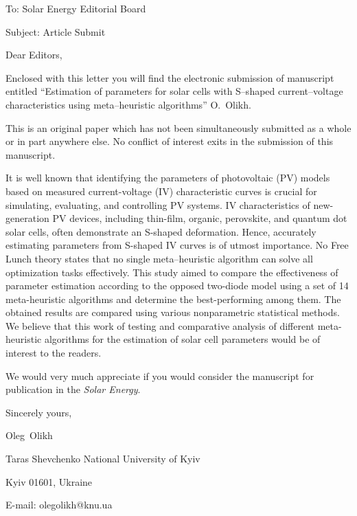\documentclass[preprint]{elsarticle}
\begin{document}
To:
Solar Energy Editorial Board


Subject:
Article Submit

\vspace{5mm}
Dear Editors,

\vspace{3mm}
Enclosed with this letter you will find the electronic submission of manuscript entitled
``Estimation of parameters for solar cells with S--shaped current--voltage characteristics using meta--heuristic algorithms'' O.~Olikh.



This is an original paper which has not been simultaneously submitted as a whole or in part anywhere else.
No conflict of interest exits in the submission of this manuscript.


It is well known that identifying the parameters of photovoltaic (PV) models based on measured current-voltage (IV) characteristic curves
is crucial for simulating, evaluating, and controlling PV systems.
IV characteristics of new-generation PV devices,
including thin-film, organic, perovskite, and quantum dot solar cells, often demonstrate an S-shaped deformation.
Hence, accurately estimating parameters from S-shaped IV curves is of utmost importance.
No Free Lunch theory states that no single meta--heuristic algorithm can solve all optimization tasks effectively.
This study aimed to compare the effectiveness of parameter estimation according to the opposed two-diode model
using a set of 14 meta-heuristic algorithms and determine the best-performing among them.
The obtained results are compared using various nonparametric statistical methods.
We believe that this work of testing and comparative analysis of different meta-heuristic algorithms for the estimation of solar cell parameters
would be of interest to the readers.


We would  very much appreciate if you would consider the manuscript for publication in the \emph{Solar Energy}.

\vspace{3mm}

Sincerely yours,

Oleg~Olikh


Taras Shevchenko National University of Kyiv


Kyiv 01601, Ukraine

E-mail: olegolikh@knu.ua


\end{document}
